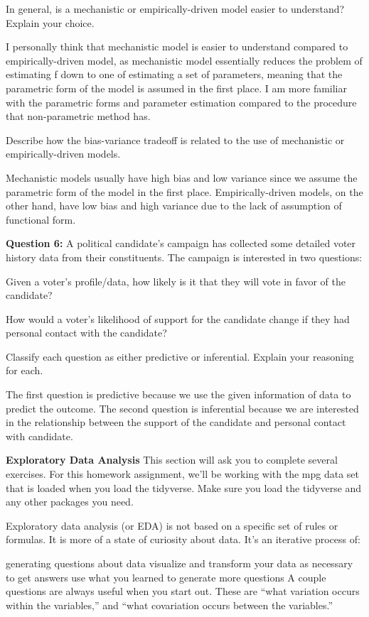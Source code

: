 \documentclass[
]{article}
\begin{document}
In general, is a mechanistic or empirically-driven model easier to
understand? Explain your choice.

I personally think that mechanistic model is easier to understand
compared to empirically-driven model, as mechanistic model essentially
reduces the problem of estimating f down to one of estimating a set of
parameters, meaning that the parametric form of the model is assumed in
the first place. I am more familiar with the parametric forms and
parameter estimation compared to the procedure that non-parametric
method has.

Describe how the bias-variance tradeoff is related to the use of
mechanistic or empirically-driven models.

Mechanistic models usually have high bias and low variance since we
assume the parametric form of the model in the first place.
Empirically-driven models, on the other hand, have low bias and high
variance due to the lack of assumption of functional form.

\textbf{Question 6:} A political candidate's campaign has collected some
detailed voter history data from their constituents. The campaign is
interested in two questions:

Given a voter's profile/data, how likely is it that they will vote in
favor of the candidate?

How would a voter's likelihood of support for the candidate change if
they had personal contact with the candidate?

Classify each question as either predictive or inferential. Explain your
reasoning for each.

The first question is predictive because we use the given information of
data to predict the outcome. The second question is inferential because
we are interested in the relationship between the support of the
candidate and personal contact with candidate.

\textbf{Exploratory Data Analysis} This section will ask you to complete
several exercises. For this homework assignment, we'll be working with
the mpg data set that is loaded when you load the tidyverse. Make sure
you load the tidyverse and any other packages you need.

Exploratory data analysis (or EDA) is not based on a specific set of
rules or formulas. It is more of a state of curiosity about data. It's
an iterative process of:

generating questions about data visualize and transform your data as
necessary to get answers use what you learned to generate more questions
A couple questions are always useful when you start out. These are
``what variation occurs within the variables,'' and ``what covariation
occurs between the variables.''
\end{document}
